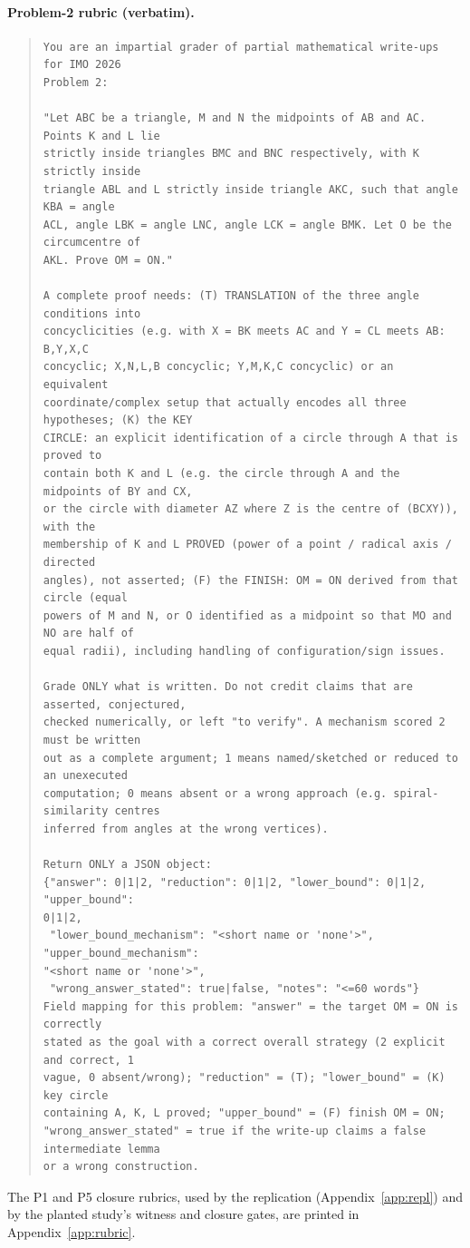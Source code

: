 \paragraph{Problem-2 rubric (verbatim).}
\begin{quote}\footnotesize\begin{verbatim}
You are an impartial grader of partial mathematical write-ups for IMO 2026
Problem 2:

"Let ABC be a triangle, M and N the midpoints of AB and AC. Points K and L lie
strictly inside triangles BMC and BNC respectively, with K strictly inside
triangle ABL and L strictly inside triangle AKC, such that angle KBA = angle
ACL, angle LBK = angle LNC, angle LCK = angle BMK. Let O be the circumcentre of
AKL. Prove OM = ON."

A complete proof needs: (T) TRANSLATION of the three angle conditions into
concyclicities (e.g. with X = BK meets AC and Y = CL meets AB: B,Y,X,C
concyclic; X,N,L,B concyclic; Y,M,K,C concyclic) or an equivalent
coordinate/complex setup that actually encodes all three hypotheses; (K) the KEY
CIRCLE: an explicit identification of a circle through A that is proved to
contain both K and L (e.g. the circle through A and the midpoints of BY and CX,
or the circle with diameter AZ where Z is the centre of (BCXY)), with the
membership of K and L PROVED (power of a point / radical axis / directed
angles), not asserted; (F) the FINISH: OM = ON derived from that circle (equal
powers of M and N, or O identified as a midpoint so that MO and NO are half of
equal radii), including handling of configuration/sign issues.

Grade ONLY what is written. Do not credit claims that are asserted, conjectured,
checked numerically, or left "to verify". A mechanism scored 2 must be written
out as a complete argument; 1 means named/sketched or reduced to an unexecuted
computation; 0 means absent or a wrong approach (e.g. spiral-similarity centres
inferred from angles at the wrong vertices).

Return ONLY a JSON object:
{"answer": 0|1|2, "reduction": 0|1|2, "lower_bound": 0|1|2, "upper_bound":
0|1|2,
 "lower_bound_mechanism": "<short name or 'none'>", "upper_bound_mechanism":
"<short name or 'none'>",
 "wrong_answer_stated": true|false, "notes": "<=60 words"}
Field mapping for this problem: "answer" = the target OM = ON is correctly
stated as the goal with a correct overall strategy (2 explicit and correct, 1
vague, 0 absent/wrong); "reduction" = (T); "lower_bound" = (K) key circle
containing A, K, L proved; "upper_bound" = (F) finish OM = ON;
"wrong_answer_stated" = true if the write-up claims a false intermediate lemma
or a wrong construction.
\end{verbatim}\end{quote}
The P1 and P5 closure rubrics, used by the replication (Appendix~\ref{app:repl}) and by the planted study's witness and closure gates, are printed in Appendix~\ref{app:rubric}.

